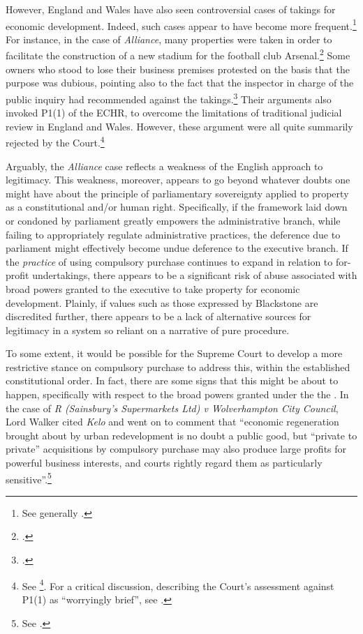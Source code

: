 However, England and Wales have also seen controversial cases of takings for economic development. Indeed, such cases appear to have become more frequent.\footnote{See generally \cite{gray11}.} For instance, in the case of {\it Alliance}, many properties were taken in order to facilitate the construction of a new stadium for the football club Arsenal.\footcite{alliance06} Some owners who stood to lose their business premises protested on the basis that the purpose was dubious, pointing also to the fact that the inspector in charge of the public inquiry had recommended against the takings.\footcite[6-7]{alliance06} Their arguments also invoked P1(1) of the ECHR, to overcome the limitations of traditional judicial review in England and Wales. However, these argument were all quite summarily rejected by the Court.\footnote{See \footcite[6-7]{alliance06}. For a critical discussion, describing the Court's assessment against P1(1) as ``worryingly brief'', see \cite{gray11}.}

Arguably, the {\it Alliance} case reflects a weakness of the English approach to legitimacy. This weakness, moreover, appears to go beyond whatever doubts one might have about the principle of parliamentary sovereignty applied to property as a constitutional and/or human right. Specifically, if the framework laid down or condoned by parliament greatly empowers the administrative branch, while failing to appropriately regulate administrative practices, the deference due to parliament might effectively become undue deference to the executive branch. If the {\it practice} of using compulsory purchase continues to expand in relation to for-profit undertakings, there appears to be a significant risk of abuse associated with broad powers granted to the executive to take property for economic development. Plainly, if values such as those expressed by Blackstone are discredited further, there appears to be a lack of alternative sources for legitimacy in a system so reliant on a narrative of pure procedure.

To some extent, it would be possible for the Supreme Court to develop a more restrictive stance on compulsory purchase to address this, within the established constitutional order. In fact, there are some signs that this might be about to happen, specifically with respect to the broad powers granted under the the \cite[226]{tcpa90}. In the case of {\it R (Sainsbury's Supermarkets Ltd) v Wolverhampton City Council}, Lord Walker cited {\it Kelo} and went on to comment that ``economic regeneration brought about by urban redevelopment is no doubt a public good, but ``private to private'' acquisitions by compulsory purchase may also produce large profits for powerful business interests, and courts rightly regard them as particularly sensitive''.\footnote{See \cite[82]{sainsbury10}.}

